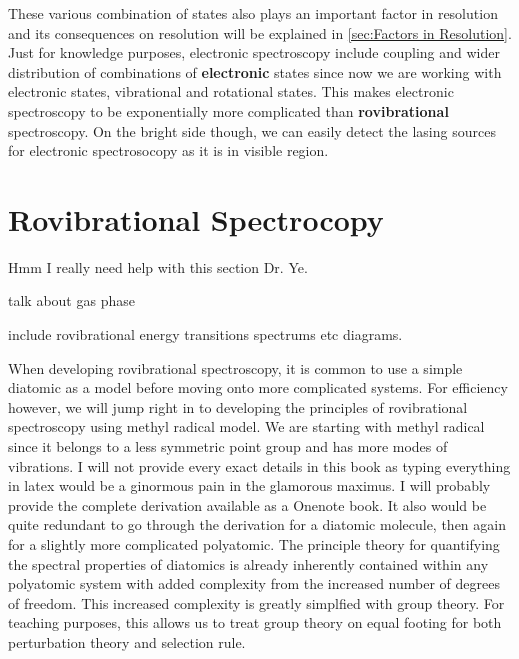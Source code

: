 \documentclass[11pt,a4paper]{book}
\begin{document}
		These various combination of states also plays an important factor in resolution and its consequences on resolution will be explained in \autoref{sec:Factors in Resolution}. Just for knowledge purposes, electronic spectroscopy include coupling and wider distribution of combinations of \textbf{electronic} states since now we are working with electronic states, vibrational and rotational states. This makes electronic spectroscopy to be exponentially more complicated than \textbf{rovibrational} spectroscopy. On the bright side though, we can easily detect the lasing sources for electronic spectrosocopy as it is in visible region.
		
	\section{Rovibrational Spectrocopy}
		\label{sec:Rovibrational Spectrocopy}
		Hmm I really need help with this section Dr. Ye.
		
		talk about gas phase
		
		include rovibrational energy transitions spectrums etc diagrams.
		
		When developing rovibrational spectroscopy, it is common to use a simple diatomic as a model before moving onto more complicated systems. For efficiency however, we will jump right in to developing the principles of rovibrational spectroscopy using methyl radical model. We are starting with methyl radical since it belongs to a less symmetric point group and has more modes of vibrations. I will not provide every exact details in this book as  typing everything in latex would be a ginormous pain in the glamorous maximus. I will probably provide the complete derivation available as a Onenote book. It also would be quite redundant to go through the derivation for a diatomic molecule, then again for a slightly more complicated polyatomic. The principle theory for quantifying the spectral properties of diatomics is already inherently contained within any polyatomic system with added complexity from the increased number of degrees of freedom. This increased complexity is greatly simplfied with group theory. For teaching purposes, this allows us to treat group theory on equal footing for both perturbation theory and selection rule.
		
\end{document}
